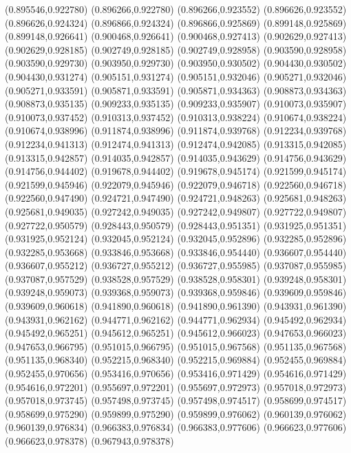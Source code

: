 (0.895546,0.922780)
(0.896266,0.922780)
(0.896266,0.923552)
(0.896626,0.923552)
(0.896626,0.924324)
(0.896866,0.924324)
(0.896866,0.925869)
(0.899148,0.925869)
(0.899148,0.926641)
(0.900468,0.926641)
(0.900468,0.927413)
(0.902629,0.927413)
(0.902629,0.928185)
(0.902749,0.928185)
(0.902749,0.928958)
(0.903590,0.928958)
(0.903590,0.929730)
(0.903950,0.929730)
(0.903950,0.930502)
(0.904430,0.930502)
(0.904430,0.931274)
(0.905151,0.931274)
(0.905151,0.932046)
(0.905271,0.932046)
(0.905271,0.933591)
(0.905871,0.933591)
(0.905871,0.934363)
(0.908873,0.934363)
(0.908873,0.935135)
(0.909233,0.935135)
(0.909233,0.935907)
(0.910073,0.935907)
(0.910073,0.937452)
(0.910313,0.937452)
(0.910313,0.938224)
(0.910674,0.938224)
(0.910674,0.938996)
(0.911874,0.938996)
(0.911874,0.939768)
(0.912234,0.939768)
(0.912234,0.941313)
(0.912474,0.941313)
(0.912474,0.942085)
(0.913315,0.942085)
(0.913315,0.942857)
(0.914035,0.942857)
(0.914035,0.943629)
(0.914756,0.943629)
(0.914756,0.944402)
(0.919678,0.944402)
(0.919678,0.945174)
(0.921599,0.945174)
(0.921599,0.945946)
(0.922079,0.945946)
(0.922079,0.946718)
(0.922560,0.946718)
(0.922560,0.947490)
(0.924721,0.947490)
(0.924721,0.948263)
(0.925681,0.948263)
(0.925681,0.949035)
(0.927242,0.949035)
(0.927242,0.949807)
(0.927722,0.949807)
(0.927722,0.950579)
(0.928443,0.950579)
(0.928443,0.951351)
(0.931925,0.951351)
(0.931925,0.952124)
(0.932045,0.952124)
(0.932045,0.952896)
(0.932285,0.952896)
(0.932285,0.953668)
(0.933846,0.953668)
(0.933846,0.954440)
(0.936607,0.954440)
(0.936607,0.955212)
(0.936727,0.955212)
(0.936727,0.955985)
(0.937087,0.955985)
(0.937087,0.957529)
(0.938528,0.957529)
(0.938528,0.958301)
(0.939248,0.958301)
(0.939248,0.959073)
(0.939368,0.959073)
(0.939368,0.959846)
(0.939609,0.959846)
(0.939609,0.960618)
(0.941890,0.960618)
(0.941890,0.961390)
(0.943931,0.961390)
(0.943931,0.962162)
(0.944771,0.962162)
(0.944771,0.962934)
(0.945492,0.962934)
(0.945492,0.965251)
(0.945612,0.965251)
(0.945612,0.966023)
(0.947653,0.966023)
(0.947653,0.966795)
(0.951015,0.966795)
(0.951015,0.967568)
(0.951135,0.967568)
(0.951135,0.968340)
(0.952215,0.968340)
(0.952215,0.969884)
(0.952455,0.969884)
(0.952455,0.970656)
(0.953416,0.970656)
(0.953416,0.971429)
(0.954616,0.971429)
(0.954616,0.972201)
(0.955697,0.972201)
(0.955697,0.972973)
(0.957018,0.972973)
(0.957018,0.973745)
(0.957498,0.973745)
(0.957498,0.974517)
(0.958699,0.974517)
(0.958699,0.975290)
(0.959899,0.975290)
(0.959899,0.976062)
(0.960139,0.976062)
(0.960139,0.976834)
(0.966383,0.976834)
(0.966383,0.977606)
(0.966623,0.977606)
(0.966623,0.978378)
(0.967943,0.978378)
